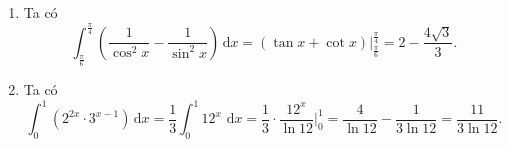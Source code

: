 \begin{bt}
{\begin{enumerate}
\begin{align*}
				&=\displaystyle\int_0^{\tfrac{\pi }4}{\left(\cos  x-\sin x\right)}\mathrm{\,d}x=\left(\sin x+\cos x\right) \Bigg|_0^{\tfrac{\pi }4}=\sqrt2-1.
			\end{align*}
			 \item Ta có \[\displaystyle\int_{\tfrac{\pi }6}^{\tfrac{\pi }4}{\left(\dfrac1{\cos^2x}-\dfrac1{\sin^2x}\right)\mathrm{\,d}x}=\left(\tan x+\cot x\right) \Bigg|_{\tfrac{\pi }6}^{\tfrac{\pi }4}=2-\dfrac{4\sqrt3}3.\]
			\item Ta có  \[\displaystyle\int_0^1{\left({2^{2x}}\cdot3^{x-1}\right)\mathrm{\,d}x}=\dfrac13\displaystyle\int_0^1{{{12}^x} \, \mathrm{\,d}x}=\dfrac13\cdot\dfrac{{{12}^x}}{\ln12}\Bigg|_0^1=\dfrac4{\ln12}-\dfrac1{3 \ln12}=\dfrac{11}{3 \ln12}.\]
		\end{enumerate}
	} 
\end{bt}

